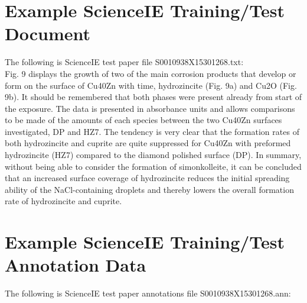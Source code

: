 \appendix
\section{Example ScienceIE Training/Test Document}
\label{appendix:egpaper}
The following is ScienceIE test paper file S0010938X15301268.txt:\\

\noindent Fig. 9 displays the growth of two of the main corrosion products that develop or form on the surface of Cu40Zn with time, hydrozincite (Fig. 9a) and Cu2O (Fig. 9b). It should be remembered that both phases were present already from start of the exposure. The data is presented in absorbance units and allows comparisons to be made of the amounts of each species between the two Cu40Zn surfaces investigated, DP and HZ7. The tendency is very clear that the formation rates of both hydrozincite and cuprite are quite suppressed for Cu40Zn with preformed hydrozincite (HZ7) compared to the diamond polished surface (DP). In summary, without being able to consider the formation of simonkolleite, it can be concluded that an increased surface coverage of hydrozincite reduces the initial spreading ability of the NaCl-containing droplets and thereby lowers the overall formation rate of hydrozincite and cuprite.

\section{Example ScienceIE Training/Test Annotation Data}
\label{appendix:egann}
The following is ScienceIE test paper annotations file S0010938X15301268.ann:\\

